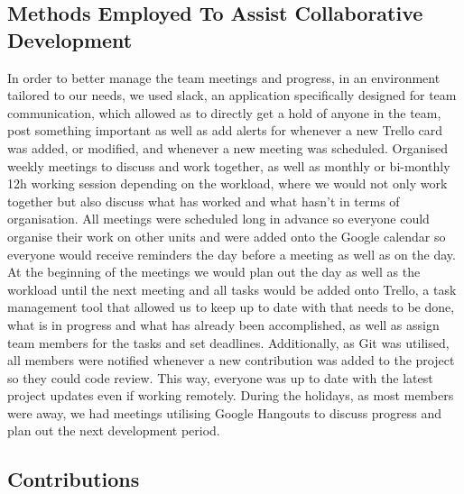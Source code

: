 \documentclass[11pt,a4paper]{article}
\begin{document}
        \subsection{Methods Employed To Assist Collaborative Development}
        In order to better manage the team meetings and progress, in an environment tailored to our needs, we used slack, an application specifically designed for team communication, which allowed as to directly get a hold of anyone in the team, post something important as well as add alerts for whenever a new Trello card was added, or modified, and whenever a new meeting was scheduled. 
        Organised weekly meetings to discuss and work together, as well as monthly or bi-monthly 12h working session depending on the workload, where we would not only work together but also discuss what has worked and what hasn’t in terms of organisation. All meetings were scheduled long in advance so everyone could organise their work on other units and were added onto the Google calendar so everyone would receive reminders the day before a meeting as well as on the day.
        At the beginning of the meetings we would plan out the day as well as the workload until the next meeting and all tasks would be added onto Trello, a task management tool that allowed us to keep up to date with that needs to be done, what is in progress and what has already been accomplished, as well as assign team members for the tasks and set deadlines.
        Additionally, as Git was utilised, all members were notified whenever a new contribution was added to the project so they could code review. This way, everyone was up to date with the latest project updates even if working remotely. 
        During the holidays, as most members were away, we had meetings utilising Google Hangouts to discuss progress and plan out the next development period. 


        \subsection{Contributions}
\end{document}
